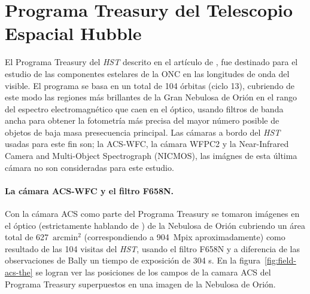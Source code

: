 \section{Programa Treasury del Telescopio Espacial Hubble}
\label{sec:wfpc2}

El Programa Treasury del \textit{HST} descrito en el artículo de \citet{Robberto:2013a}, fue destinado para el estudio de las componentes estelares de la ONC en las longitudes de onda del visible. El programa se basa en un total de 104 órbitas (ciclo 13), cubriendo de este modo las regiones más brillantes de la Gran Nebulosa de Orión en el rango del espectro electromagnético que caen en el óptico, usando filtros de banda ancha para obtener la fotometría más precisa del mayor número posible de objetos de baja masa presecuencia principal. Las cámaras a bordo del \textit{HST} usadas para este fin son; la ACS-WFC, la  cámara  WFPC2 y la Near-Infrared Camera and Multi-Object Spectrograph (NICMOS), las imágnes de esta última cámara no son consideradas para este estudio. \\    

\paragraph{La cámara ACS-WFC y el filtro F658N.}
Con la cámara ACS como parte del Programa Treasury se tomaron imágenes en el óptico (estrictamente hablando de \ha{}) de la Nebulosa de Orión cubriendo un área total de 627~\(\mathrm{arcmin^2}\) (correspondiendo a 904~Mpix aproximadamente) como resultado de las 104 visitas del \textit{HST}, usando el filtro F658N y a diferencia de las observaciones de Bally un tiempo de exposición de 304 s. En la figura~\ref{fig:field-acs-the} se logran ver las posiciones de los campos de la camara ACS del Programa Treasury superpuestos en una imagen de la Nebulosa de Orión. \\

